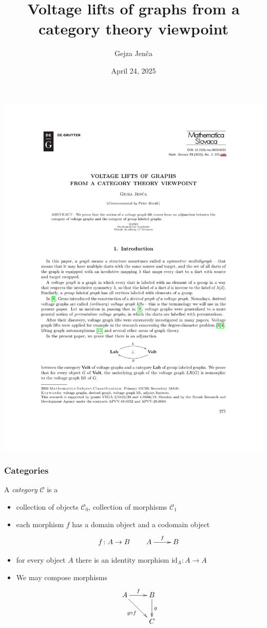 \documentclass{beamer}
\title[Voltage lifts]{Voltage lifts of graphs from a category theory viewpoint}
\author{Gejza Jenča}
\institute[]{Slovak University of Technology Bratislava}
\date{April 24, 2025}
\newcommand{\id}{\mathrm{id}}
\newcommand{\C}{\mathcal{C}}
\begin{document}
\begin{frame}
\maketitle
\end{frame}
\begin{frame}
\begin{center}
\includegraphics[scale=0.3]{page}
\end{center}
\end{frame}
\begin{frame}
\frametitle{Categories}
\begin{definition}
A \emph{category} $\C$ is a
\begin{itemize}
\item collection of objects $\C_0$, collection of morphisms $\C_1$
\item each morphism $f$ has a domain object and a codomain object 
\[
f\colon A\to B\qquad\xymatrix{A\ar[r]^f &B}
\]
\item for every object $A$ there is an identity morphism $\id_A\colon A\to A$
\item We may compose morphisms
\[
\xymatrix{
A
    \ar[r]^f
    \ar[rd]_{g\circ f}
&
B
    \ar[d]^g
\\
~
&
C
}
\]
\end{itemize}
\end{definition}
\end{frame}
\end{document}

